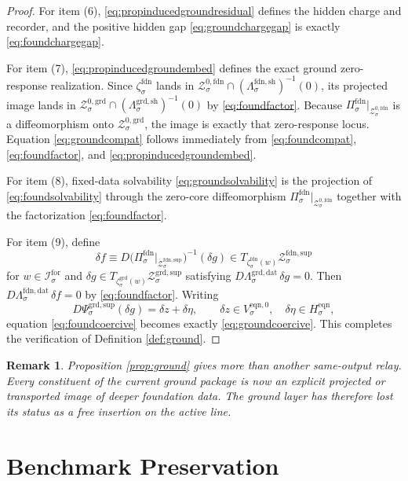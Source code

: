 \documentclass[11pt]{article}
\newcommand{\ForSpace}[1]{\mathcal I_{#1}^{\mathrm{for}}}
\newcommand{\GroundData}[1]{\Lambda_{#1}^{\mathrm{grd,dat}}}
\newcommand{\GroundShellMap}[1]{\Lambda_{#1}^{\mathrm{grd,sh}}}
\newcommand{\GroundSupportShell}[1]{\mathcal Z_{#1}^{\mathrm{grd,sup}}}
\newcommand{\GroundZeroCore}[1]{\mathcal Z_{#1}^{0,\mathrm{grd}}}
\newcommand{\GroundEqChart}[1]{\Psi_{#1}^{\mathrm{grd,sup}}}
\newcommand{\GroundEmbed}[1]{\zeta_{#1}^{\mathrm{grd}}}
\newcommand{\FoundProj}[1]{\Pi_{#1}^{\mathrm{fdn}}}
\newcommand{\FoundData}[1]{\Lambda_{#1}^{\mathrm{fdn,dat}}}
\newcommand{\FoundShellMap}[1]{\Lambda_{#1}^{\mathrm{fdn,sh}}}
\newcommand{\FoundSupportShell}[1]{\mathcal Z_{#1}^{\mathrm{fdn,sup}}}
\newcommand{\FoundZeroCore}[1]{\mathcal Z_{#1}^{0,\mathrm{fdn}}}
\newcommand{\FoundEmbed}[1]{\zeta_{#1}^{\mathrm{fdn}}}
\newcommand{\EqnHidden}[1]{H_{#1}^{\mathrm{eqn}}}
\newcommand{\EqnZero}[1]{V_{#1}^{\mathrm{eqn},0}}
\newtheorem{remark}{Remark}
\begin{document}
\begin{proof}
For item (6), \eqref{eq:propinducedgroundresidual} defines the hidden charge and recorder, and the positive hidden gap \eqref{eq:groundchargegap} is exactly \eqref{eq:foundchargegap}.

For item (7), \eqref{eq:propinducedgroundembed} defines the exact ground zero-response realization. Since \(\FoundEmbed{\sigma}\) lands in \(\FoundZeroCore{\sigma}\cap(\FoundShellMap{\sigma})^{-1}(0)\), its projected image lands in \(\GroundZeroCore{\sigma}\cap(\GroundShellMap{\sigma})^{-1}(0)\) by \eqref{eq:foundfactor}. Because \(\FoundProj{\sigma}\big|_{\FoundZeroCore{\sigma}}\) is a diffeomorphism onto \(\GroundZeroCore{\sigma}\), the image is exactly that zero-response locus. Equation \eqref{eq:groundcompat} follows immediately from \eqref{eq:foundcompat}, \eqref{eq:foundfactor}, and \eqref{eq:propinducedgroundembed}.

For item (8), fixed-data solvability \eqref{eq:groundsolvability} is the projection of \eqref{eq:foundsolvability} through the zero-core diffeomorphism \(\FoundProj{\sigma}\big|_{\FoundZeroCore{\sigma}}\) together with the factorization \eqref{eq:foundfactor}.

For item (9), define
\[
\delta f
\equiv
D\bigl(\FoundProj{\sigma}\big|_{\FoundSupportShell{\sigma}}\bigr)^{-1}(\delta g)
\in
T_{\FoundEmbed{\sigma}(w)}\FoundSupportShell{\sigma}
\]
for \(w\in\ForSpace{\sigma}\) and \(\delta g\in T_{\GroundEmbed{\sigma}(w)}\GroundSupportShell{\sigma}\) satisfying \(D\GroundData{\sigma}\,\delta g=0\). Then \(D\FoundData{\sigma}\,\delta f=0\) by \eqref{eq:foundfactor}. Writing
\[
D\GroundEqChart{\sigma}(\delta g)=\delta z+\delta\eta,
\qquad
\delta z\in\EqnZero{\sigma},
\quad
\delta\eta\in\EqnHidden{\sigma},
\]
equation \eqref{eq:foundcoercive} becomes exactly \eqref{eq:groundcoercive}. This completes the verification of Definition \ref{def:ground}.
\end{proof}

\begin{remark}
Proposition \ref{prop:ground} gives more than another same-output relay. Every constituent of the current ground package is now an explicit projected or transported image of deeper foundation data. The ground layer has therefore lost its status as a free insertion on the active line.
\end{remark}

\section{Benchmark Preservation}
\end{document}
